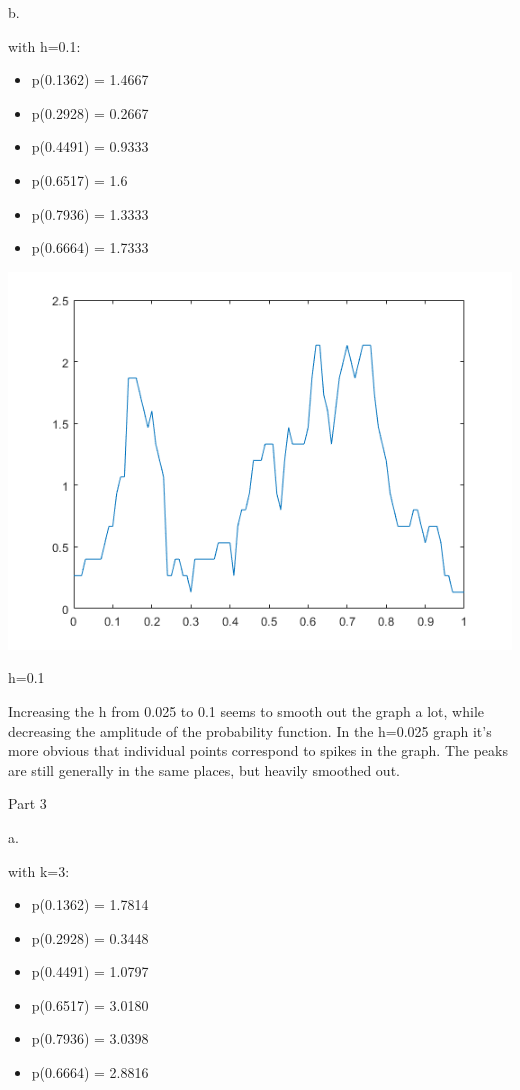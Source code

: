 \documentclass[a4paper]{article}
\begin{document}
\noindent
b. 

\noindent
with h=0.1:
\begin{itemize}
    \item p(0.1362) = 1.4667
    \item p(0.2928) = 0.2667
    \item p(0.4491) = 0.9333
    \item p(0.6517) = 1.6
    \item p(0.7936) = 1.3333
    \item p(0.6664) = 1.7333
\end{itemize}

\begin{center}
    \includegraphics[scale=1]{3b.png}
    \caption{h=0.1}
\end{center}

\noindent
Increasing the h from 0.025 to 0.1 seems to smooth out the graph a lot, while decreasing the amplitude of the probability function. In the h=0.025 graph it's more obvious that individual points correspond to spikes in the graph. The peaks are still generally in the same places, but heavily smoothed out.

\noindent
Part 3

\noindent
a.

\noindent
with k=3:
\begin{itemize}
    \item p(0.1362) = 1.7814
    \item p(0.2928) = 0.3448
    \item p(0.4491) = 1.0797
    \item p(0.6517) = 3.0180
    \item p(0.7936) = 3.0398
    \item p(0.6664) = 2.8816
\end{itemize}
\end{document}
